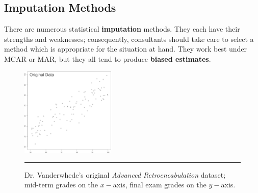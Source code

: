\subsection{Imputation Methods}
There are numerous statistical \textbf{imputation} methods. They each have their strengths and weaknesses; consequently, consultants should take care to select a method which is appropriate for the situation at hand. They work best under MCAR or MAR, but they all tend to produce \textbf{biased estimates}.
\begin{figure}[t]
\centering
\includegraphics[width=0.4\textwidth]{Images/original.png}
\caption[\small Dr. Vanderwhede's original \textit{Advanced Retroencabulation} dataset]{\small Dr. Vanderwhede's original \textit{Advanced Retroencabulation} dataset; mid-term grades on the $x-$axis, final exam grades on the $y-$axis.} \label{fig:ori}\hrule
\end{figure}
\afterpage{\FloatBarrier}
